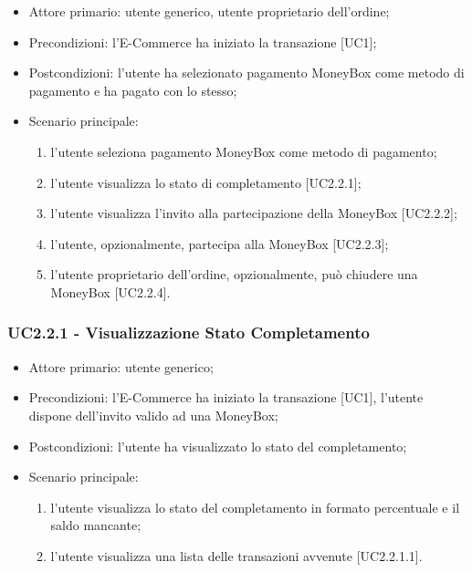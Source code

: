     \begin{itemize}
    \item Attore primario: utente generico, utente proprietario dell'ordine;
    \item Precondizioni: l'E-Commerce ha iniziato la transazione [UC1];
    \item Postcondizioni: l'utente ha selezionato pagamento MoneyBox come metodo di pagamento e ha pagato con lo stesso;
    \item Scenario principale:
    \begin{enumerate}
        \item l'utente seleziona pagamento MoneyBox come metodo di pagamento;
        \item l'utente visualizza lo stato di completamento [UC2.2.1];
        \item l'utente visualizza l'invito alla partecipazione della MoneyBox [UC2.2.2];
        \item l'utente, opzionalmente, partecipa alla MoneyBox [UC2.2.3];
        \item l'utente proprietario dell'ordine, opzionalmente, può chiudere una MoneyBox [UC2.2.4].
        \end{enumerate}
    \end{itemize}

    \subsubsection{UC2.2.1 - Visualizzazione Stato Completamento}

    \begin{itemize}
    \item Attore primario: utente generico;
    \item Precondizioni: l'E-Commerce ha iniziato la transazione [UC1], l'utente dispone dell'invito valido ad una MoneyBox;
    \item Postcondizioni: l'utente ha visualizzato lo stato del completamento;
    \item Scenario principale:
    \begin{enumerate}
        \item l'utente visualizza lo stato del completamento in formato percentuale e il saldo mancante;
        \item l'utente visualizza una lista delle transazioni avvenute [UC2.2.1.1].
        \end{enumerate}
    \end{itemize}

